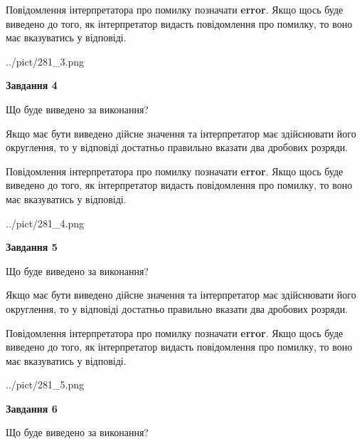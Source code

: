 \documentclass[12pt, ukrainian]{article}
\begin{document}
{\begin {Large}
Повідомлення інтерпретатора про помилку позначати \textbf{error}.
Якщо щось буде виведено до того, як інтерпретатор видасть повідомлення про помилку, 
то воно має вказуватись у відповіді. \par

\begin{center}
	{../pict/281_3.png}
\end{center}
\newpage

{\begin {center}\textbf{Завдання 4}\end {center}}\par
Що буде виведено за виконання? \par

Якщо має бути виведено дійсне значення та інтерпретатор має здійснювати його округлення, 
то у відповіді достатньо правильно вказати два дробових розряди.

Повідомлення інтерпретатора про помилку позначати \textbf{error}.
Якщо щось буде виведено до того, як інтерпретатор видасть повідомлення про помилку, 
то воно має вказуватись у відповіді. \par

\begin{center}
	{../pict/281_4.png}
\end{center}
\newpage

{\begin {center}\textbf{Завдання 5}\end {center}}\par
Що буде виведено за виконання? \par

Якщо має бути виведено дійсне значення та інтерпретатор має здійснювати його округлення, 
то у відповіді достатньо правильно вказати два дробових розряди.

Повідомлення інтерпретатора про помилку позначати \textbf{error}.
Якщо щось буде виведено до того, як інтерпретатор видасть повідомлення про помилку, 
то воно має вказуватись у відповіді. \par

\begin{center}
	{../pict/281_5.png}
\end{center}
\newpage

{\begin {center}\textbf{Завдання 6}\end {center}}\par
Що буде виведено за виконання? \par


\end{Large}}
\end{document}
